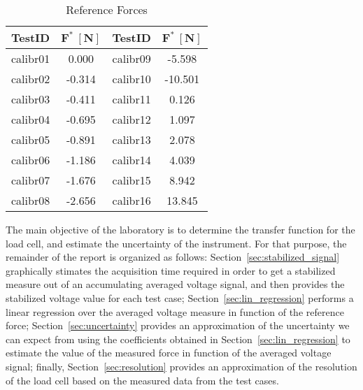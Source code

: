 \documentclass[12pt]{article}
\begin{document}
        \begin{table}[!ht]
                \label{tab:data}
                \begin{tabular}{|cc|cc|}
                        \hline
                        \textbf{TestID} & \( \pmb{F^* \: \left[ N \right]} \) & \textbf{TestID} & \( \pmb{F^* \: \left[ N \right]} \) \\ \hline
                        calibr01        & 0.000               & calibr09        & -5.598              \\
                        calibr02        & -0.314              & calibr10        & -10.501             \\
                        calibr03        & -0.411              & calibr11        & 0.126               \\
                        calibr04        & -0.695              & calibr12        & 1.097               \\
                        calibr05        & -0.891              & calibr13        & 2.078               \\
                        calibr06        & -1.186              & calibr14        & 4.039               \\
                        calibr07        & -1.676              & calibr15        & 8.942               \\
                        calibr08        & -2.656              & calibr16        & 13.845              \\ \hline
                \end{tabular}
                \centering
                \caption{Reference Forces}
        \end{table}

        The main objective of the laboratory is to determine the transfer function for the load cell, and estimate the uncertainty of the instrument. For that purpose, the remainder of the report is organized as follows: Section~\ref{sec:stabilized_signal} graphically stimates the acquisition time required in order to get a stabilized measure out of an accumulating averaged voltage signal, and then provides the stabilized voltage value for each test case; Section~\ref{sec:lin_regression} performs a linear regression over the averaged voltage measure in function of the reference force; Section~\ref{sec:uncertainty} provides an approximation of the uncertainty we can expect from using the coefficients obtained in Section~\ref{sec:lin_regression} to estimate the value of the measured force in function of the averaged voltage signal; finally, Section~\ref{sec:resolution} provides an approximation of the resolution of the load cell based on the measured data from the test cases.
\end{document}
